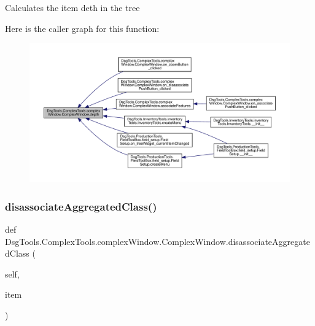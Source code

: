 \begin{DoxyVerb}Calculates the item deth in the tree
\end{DoxyVerb}
 Here is the caller graph for this function\+:
\nopagebreak
\begin{figure}[H]
\begin{center}
\leavevmode
\includegraphics[width=350pt]{class_dsg_tools_1_1_complex_tools_1_1complex_window_1_1_complex_window_ab97194d04bc78eb3536f4c5c8325cbe1_icgraph}
\end{center}
\end{figure}
\mbox{\label{class_dsg_tools_1_1_complex_tools_1_1complex_window_1_1_complex_window_a7303c98e007e37e70497c56e877487c6}} 
\subsubsection{\texorpdfstring{disassociate\+Aggregated\+Class()}{disassociateAggregatedClass()}}
{\footnotesize\ttfamily def Dsg\+Tools.\+Complex\+Tools.\+complex\+Window.\+Complex\+Window.\+disassociate\+Aggregated\+Class (\begin{DoxyParamCaption}\item[{}]{self,  }\item[{}]{item }\end{DoxyParamCaption})}

